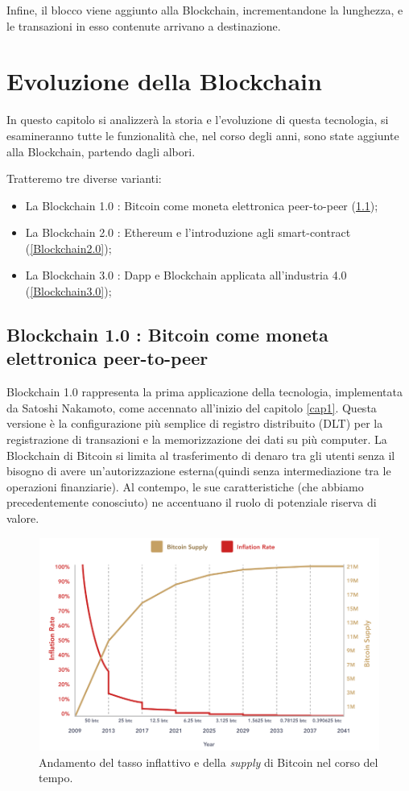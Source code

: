 Infine, il blocco viene aggiunto alla Blockchain, incrementandone la lunghezza, e le transazioni in esso contenute arrivano a destinazione.
\section{Evoluzione della Blockchain}
In questo capitolo si analizzerà la storia e l'evoluzione di questa tecnologia, si esamineranno tutte le funzionalità che, nel corso degli anni, sono state aggiunte alla Blockchain, partendo dagli albori.

Tratteremo tre diverse varianti:
\begin{itemize}
\item La Blockchain 1.0 : Bitcoin come moneta elettronica peer-to-peer (\ref{Blockchain1.0});
\item La Blockchain 2.0 : Ethereum e l'introduzione agli smart-contract (\ref{Blockchain2.0});
\item La Blockchain 3.0 : Dapp e Blockchain applicata all'industria 4.0 (\ref{Blockchain3.0});
\end{itemize}
\subsection{Blockchain 1.0 : Bitcoin come moneta elettronica peer-to-peer}\label{Blockchain1.0}
Blockchain 1.0 rappresenta la prima applicazione della tecnologia,  implementata da Satoshi Nakamoto, come accennato all'inizio del capitolo \ref{cap1}. 
Questa versione è la configurazione più semplice di registro distribuito (DLT) per la registrazione di transazioni e la memorizzazione dei dati su più computer. La Blockchain di Bitcoin si limita al trasferimento di denaro tra gli utenti senza il bisogno di avere un'autorizzazione esterna(quindi senza intermediazione tra le operazioni finanziarie). Al contempo, le sue caratteristiche (che abbiamo precedentemente conosciuto) ne accentuano il ruolo di potenziale riserva di valore.
\begin{figure}[h]
    \centering
    \includegraphics[width=13cm,height=7cm]{Immagini/halving.png}
    \caption[Grafico del tasso inflattivo e della supply di Bitcoin]{Andamento del tasso inflattivo e della \textit{supply} di Bitcoin nel corso del tempo.}
    \label{grafico_inflazione_btc}
\end{figure}
